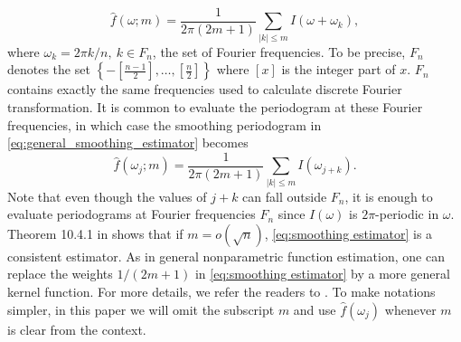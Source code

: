 \begin{equation}
\label{eq:general_smoothing_estimator}
    \hat{f}(\omega; m) = \frac{1}{2\pi(2m+1)} \sum_{|k|\le m} I(\omega+\omega_k),
\end{equation}
where $\omega_k = 2\pi k/n, ~ k\in F_n$,  the set of Fourier frequencies. To be precise, $F_n$ denotes the set  $\left\{-[\frac{n-1}{2}], \dots, [\frac{n}{2}]\right\}$ where $[x]$ is the integer part of $x$. $F_n$ contains exactly the same frequencies used to calculate discrete Fourier transformation. It is common to evaluate the periodogram at these Fourier frequencies, in which case the smoothing periodogram in \eqref{eq:general_smoothing_estimator} becomes
\begin{equation}
\label{eq:smoothing estimator}
    \hat{f}(\omega_j; m) = \frac{1}{2\pi(2m+1)} \sum_{|k|\le m} I(\omega_{j+k}).
\end{equation}
Note that even though the values of $j+k$ can fall outside $F_n$, it is enough to evaluate periodograms at Fourier frequencies $F_n$ since $I(\omega)$ is $2\pi$-periodic in $\omega$. Theorem 10.4.1 in \citet{brockwell2013time} shows that if $m = o(\sqrt{n})$, \eqref{eq:smoothing estimator} is a consistent estimator. As in general nonparametric function estimation, one can replace the weights $1/(2m+1)$ in \eqref{eq:smoothing estimator} by a more general kernel function. For more details, we refer the  readers to \cite{brockwell2013time}. To make notations simpler, in this paper we will omit the subscript $m$ and use $\hat{f}(\omega_j)$ whenever $m$ is clear from the context. 

